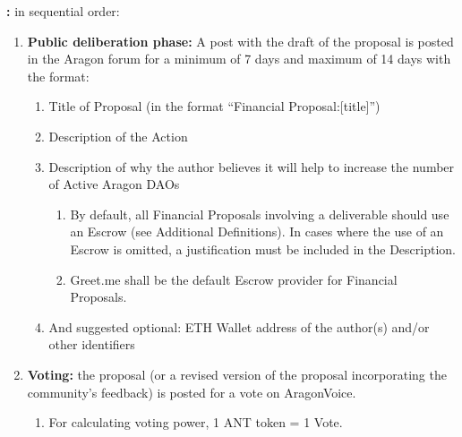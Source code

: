 \begin{enumerate}
\begin{enumerate}
		\textbf{:} in sequential order:
	
		\begin{enumerate}
			
			\item \textbf{Public deliberation phase:} A post with the draft of the proposal is posted in the Aragon forum for a minimum of 7 days and maximum of 14 days with the format:
			\begin{enumerate}
				\item Title of Proposal (in the format ``Financial Proposal:[title]'')
				\item Description of the Action
				\item Description of why the author believes it will help to increase the number of Active Aragon \acp{DAO}
				
				\begin{enumerate}
					\item By default, all Financial Proposals involving a deliverable should use an Escrow (see Additional Definitions).
					In cases where the use of an Escrow is omitted, a justification must be included in the Description.
					\item Greet.me shall be the default Escrow provider for Financial Proposals.
				\end{enumerate}
			
				\item And suggested optional: ETH Wallet address of the author(s) and/or other identifiers
					
			\end{enumerate}

			\item \textbf{Voting:} the proposal (or a revised version of the proposal incorporating the community’s feedback) is posted for a vote on \gls{AragonVoice}.
			\begin{enumerate}
				\item For calculating voting power, 1 \ac{ANT} token = 1 Vote.
			\end{enumerate}
		

\end{enumerate}
\end{enumerate}
\end{enumerate}

